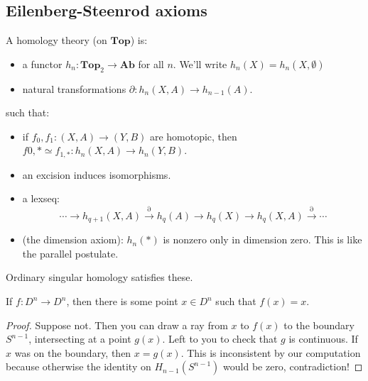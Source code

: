 \subsection{Eilenberg-Steenrod axioms}
\begin{definition}
A homology theory (on $\mathbf{Top}$) is:
\begin{itemize}
\item a functor $h_n:\mathbf{Top}_2\to\mathbf{Ab}$ for all $n$. We'll write $h_n(X)=h_n(X,\emptyset)$
\item natural transformations $\partial:h_n(X,A)\to h_{n-1}(A)$.
\end{itemize}
such that:
\begin{itemize}
\item if $f_0,f_1:(X,A)\to (Y,B)$ are homotopic, then $f{0,\ast}\simeq f_{1,\ast}:h_n(X,A)\to h_n(Y,B)$.
\item an excision induces isomorphisms.
\item a lexseq:
\begin{equation*}
\cdots\to h_{q+1}(X,A)\xrightarrow{\partial}h_q(A)\to h_q(X)\to h_q(X,A)\xrightarrow{\partial}\cdots
\end{equation*}
\item (the dimension axiom): $h_n(\ast)$ is nonzero only in dimension zero. This is like the parallel postulate.
\end{itemize}
\end{definition}
\begin{example}
Ordinary singular homology satisfies these. 
\end{example}
\begin{theorem}
If $f:D^n\to D^n$, then there is some point $x\in D^n$ such that $f(x)=x$.
\end{theorem}
\begin{proof}
Suppose not. Then you can draw a ray from $x$ to $f(x)$ to the boundary $S^{n-1}$, intersecting at a point $g(x)$. Left to you to check that $g$ is continuous. If $x$ was on the boundary, then $x=g(x)$. This is inconsistent by our computation because otherwise the identity on $ H_{n-1}(S^{n-1})$ would be zero, contradiction!
\end{proof}

